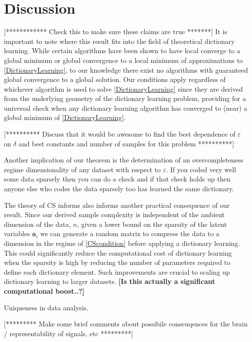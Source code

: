 \documentclass[journal, onecolumn]{IEEEtran}
\begin{document}

\section{Discussion}

[************ Check this to make sure these claims are true *******]
It is important to note where this result fits into the field of theoretical dictionary learning. While certain algorithms have been shown to have local converge to a global minimum or global convergence to a local minimum of approximations to \eqref{DictionaryLearning}, to our knowledge there exist no algorithms with guaranteed global convergence to a global solution. Our conditions apply regardless of whichever algorithm is used to solve \eqref{DictionaryLearning} since they are derived from the underlying geometry of the dictionary learning problem, providing for a universal check when any dictionary learning algorithm has converged to (near) a global minimum of \eqref{DictionaryLearning}.

[********** Discuss that it would be awesome to find the best dependence of $\varepsilon$ on $\delta$ and best constants and number of samples for this problem **********]


Another implication of our theorem is the determination of an overcompleteness regime dimensionality of any dataset with respect to $\varepsilon$. If you coded very well some data sparsely then you can do a check and if that check holds up then anyone else who codes the data sparsely too has learned the same dictionary. 

The theory of CS informs also informs another practical consequence of our result. Since our derived sample complexity is independent of the ambient dimension of the data, $n$, given a lower bound on the sparsity of the latent variables $\mathbf{a}_i$ we can generate a random matrix to compress the data to a dimension in the regime of \eqref{CScondition} before applying a dictionary learning. This could significantly reduce the computational cost of dictionary learning when the sparsity is high by reducing the number of parameters required to define each dictionary element. Such improvements are crucial to scaling up dictionary learning to larger datasets. \textbf{[Is this actually a significant computational boost..?]}

Uniqueness in data analysis.

[********* Make some brief comments about possibile conseuqences for the brain / representability of signals, etc *********]
\end{document}
